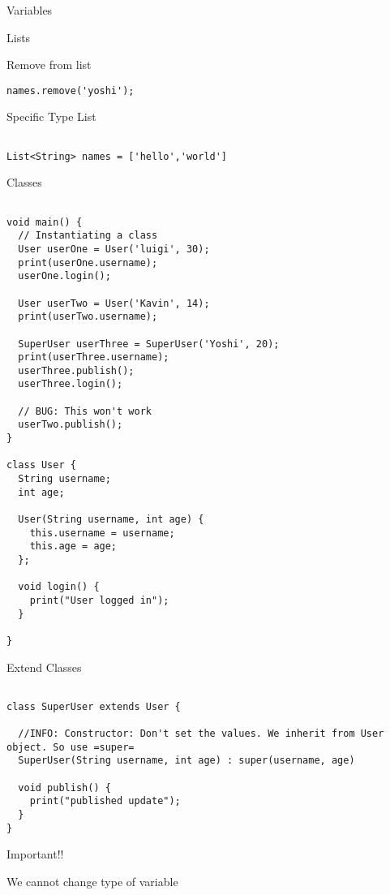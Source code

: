\documentclass[presentation]{beamer}
\begin{document}
\begin{frame}[label={sec:orgc87552c},fragile]{Variables}
\begin{block}{Lists}
\begin{block}{Remove from list}
\begin{verbatim}
names.remove('yoshi');

\end{verbatim}
\end{block}

\begin{block}{Specific Type List}
\begin{verbatim}

List<String> names = ['hello','world']

\end{verbatim}
\end{block}
\end{block}
\begin{block}{Classes}
\begin{verbatim}

void main() {
  // Instantiating a class
  User userOne = User('luigi', 30);
  print(userOne.username);
  userOne.login();

  User userTwo = User('Kavin', 14);
  print(userTwo.username);

  SuperUser userThree = SuperUser('Yoshi', 20);
  print(userThree.username);
  userThree.publish();
  userThree.login();

  // BUG: This won't work
  userTwo.publish();
}

class User {
  String username;
  int age;

  User(String username, int age) {
    this.username = username;
    this.age = age;
  };

  void login() {
    print("User logged in");
  }

}

\end{verbatim}
\begin{block}{Extend Classes}
\begin{verbatim}

class SuperUser extends User {

  //INFO: Constructor: Don't set the values. We inherit from User object. So use =super=
  SuperUser(String username, int age) : super(username, age)

  void publish() {
    print("published update");
  }
}

\end{verbatim}
\end{block}
\end{block}
\begin{block}{Important!!}
\begin{block}{We cannot change type of variable}
\begin{verbatim}


\end{verbatim}
\end{block}
\end{block}
\end{frame}
\end{document}
